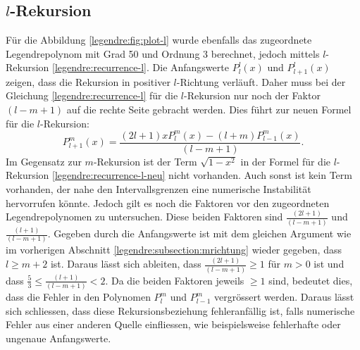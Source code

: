 \subsection{$l$-Rekursion
\label{legendre:subsection:lrichtung}}
Für die Abbildung \ref{legendre:fig:plot-l} wurde ebenfalls das zugeordnete Legendrepolynom mit Grad 50 und Ordnung 3 berechnet, jedoch mittels $l$-Rekursion \eqref{legendre:recurrence-l}.
Die Anfangswerte $P^{l}_{l}(x)$ und $P^{l}_{l+1}(x)$ zeigen, dass die Rekursion in positiver $l$-Richtung verläuft.
Daher muss bei der Gleichung \eqref{legendre:recurrence-l} für die $l$-Rekursion nur noch der Faktor $(l-m+1)$ auf die rechte Seite gebracht werden.
Dies führt zur neuen Formel für die $l$-Rekursion: 
\begin{equation}
P^{m}_{l+1}(x)
= \frac{(2l+1)xP^{m}_{l}(x)-(l+m)P^{m}_{l-1}(x)}{(l-m+1)} .
\label{legendre:recurrence-l-neu}
\end{equation}
Im Gegensatz zur $m$-Rekursion ist der Term $\sqrt{1-x^2}$ in der Formel für die $l$-Rekursion \eqref{legendre:recurrence-l-neu} nicht vorhanden.
Auch sonst ist kein Term vorhanden, der nahe den Intervallsgrenzen eine numerische Instabilität hervorrufen könnte.
Jedoch gilt es noch die Faktoren vor den zugeordneten Legendrepolynomen zu untersuchen.
Diese beiden Faktoren sind $\frac{(2l+1)}{(l-m+1)}$ und $\frac{(l+1)}{(l-m+1)}$.
Gegeben durch die Anfangswerte ist mit dem gleichen Argument wie im vorherigen Abschnitt \ref{legendre:subsection:mrichtung} wieder gegeben, dass $l\geq m+2$ ist.
Daraus lässt sich ableiten, dass $\frac{(2l+1)}{(l-m+1)}\geq 1$ für $m>0$ ist und dass $\frac{5}{3}\leq \frac{(l+1)}{(l-m+1)}<2$.
Da die beiden Faktoren jeweils $\geq 1$ sind, bedeutet dies, dass die Fehler in den Polynomen $P^{m}_{l}$ und $P^{m}_{l-1}$ vergrössert werden.
Daraus lässt sich schliessen, dass diese Rekursionsbeziehung fehleranfällig ist, falls numerische Fehler aus einer anderen Quelle einfliessen, wie beispielsweise fehlerhafte oder ungenaue Anfangswerte.

